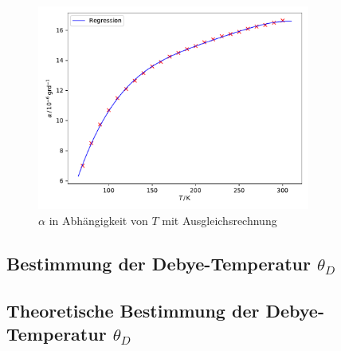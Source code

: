 \begin{figure}[H]
    \centering
    \includegraphics[width=0.8\textwidth]{build/alpha.pdf}
    \caption{$\alpha$ in Abhängigkeit von $T$ mit Ausgleichsrechnung}
    \label{fig:alpha_plot}
\end{figure}

\subsection[Theoretische Bestimmung der Debye-Temperatur]{Bestimmung der Debye-Temperatur $\theta_D$}
\label{sec:debye_temp}

\subsection[Theoretische Bestimmung der Debye-Temperatur]{Theoretische Bestimmung der Debye-Temperatur $\theta_D$}
\label{sec:theo_debye_temp}